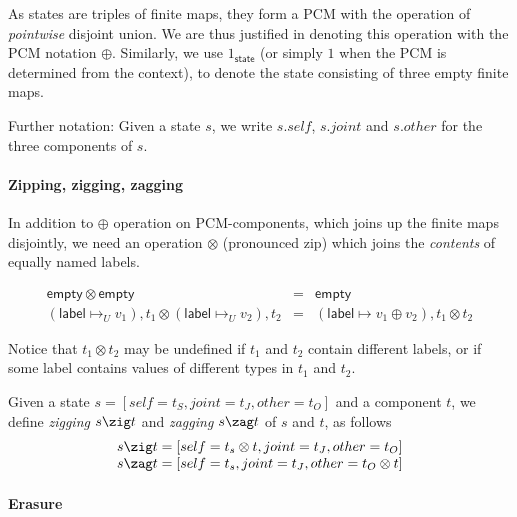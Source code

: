 As states are triples of finite maps, they form a PCM with the
operation of \emph{pointwise} disjoint union. We are thus justified in
denoting this operation with the PCM notation $\oplus$. Similarly, we
use $1_\mathsf{state}$ (or simply $1$ when the PCM is determined from
the context), to denote the state consisting of three empty finite
maps.

Further notation: Given a state $s$, we write $s.self$, $s.joint$ and
$s.other$ for the three components of $s$.


\paragraph{Zipping, zigging, zagging}

In addition to $\oplus$ operation on PCM-components, which joins up
the finite maps disjointly, we need an operation $\otimes$ (pronounced
zip) which joins the \emph{contents} of equally named labels.

\[
\begin{array}{rcl}
\mathsf{empty} \otimes \mathsf{empty} & = & \mathsf{empty}\\
(\mathsf{label} \mapsto_U v_1), t_1 \otimes (\mathsf{label} \mapsto_U v_2), t_2 & = & 
   (\mathsf{label} \mapsto v_1 \oplus v_2), t_1 \otimes t_2
\end{array}
\]

Notice that $t_1 \otimes t_2$ may be undefined if $t_1$ and $t_2$
contain different labels, or if some label contains values of
different types in $t_1$ and $t_2$.

Given a state $s = [self=t_S, joint=t_J, other=t_O]$ and a component
$t$, we define \emph{zigging} $s \zig t$ and \emph{zagging}
$s \zag t$ of $s$ and $t$, as follows
\[
\begin{array}{rcl}
s \zig t = [self = t_s \otimes t, joint=t_J, other=t_O]\\
s \zag t = [self = t_s, joint=t_J, other=t_O \otimes t]\\
\end{array}
\]


\paragraph{Erasure}

